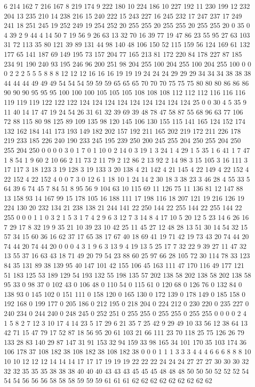 6 214 162 7 216 167 8 219 174 9 222 180 10 224 186 10 227 192 11 230 199 12 232 204 13 235 210 14 238 216 15 240 222 15 243 227 16 245 232 17 247 237 17 249 241 18 251 245 19 252 249 19 254 252 20 255 255 20 255 255 20 255 255 20 0 35 0 4 39 2 9 44 4 14 50 7 19 56 9 26 63 13 32 70 16 39 77 19 47 86 23 55 95 27 63 103 31 72 113 35 80 121 39 89 131 44 98 140 48 106 150 52 115 159 56 124 169 61 132 177 65 141 187 69 149 195 73 157 204 77 165 213 81 172 220 84 178 227 87 185 234 91 190 240 93 195 246 96 200 251 98 204 255 100 204 255 100 204 255 100 0 0 0 2 2 2 5 5 5 8 8 8 12 12 12 16 16 16 19 19 19 24 24 24 29 29 29 34 34 34 38 38 38 44 44 44 49 49 49 54 54 54 59 59 59 65 65 65 70 70 70 75 75 75 80 80 80 86 86 86 90 90 90 95 95 95 100 100 100 105 105 105 108 108 108 112 112 112 116 116 116 119 119 119 122 122 122 124 124 124 124 124 124 124 124 124 
25 0 0 30 4 5 35 9 11 40 14 17 47 19 24 54 26 31 61 32 39 69 39 48 78 47 58 87 55 68 96 63 77 106 72 88 115 80 98 125 89 109 135 98 120 145 106 130 155 115 141 165 124 152 174 132 162 184 141 173 193 149 182 202 157 192 211 165 202 219 172 211 226 178 219 233 185 226 240 190 233 245 195 239 250 200 245 255 204 250 255 204 250 255 204 250 0 0 0 0 3 0 1 7 0 1 10 0 2 14 0 3 19 1 3 24 1 4 29 1 5 35 1 6 41 1 7 47 1 8 54 1 9 60 2 10 66 2 11 73 2 11 79 2 12 86 2 13 92 2 14 98 3 15 105 3 16 111 3 17 117 3 18 123 3 19 128 3 19 133 3 20 138 4 21 142 4 21 145 4 22 149 4 22 152 4 22 152 4 22 152 4 0 0 7 3 0 12 6 1 18 10 1 24 14 2 30 18 3 38 23 3 46 28 4 55 33 5 64 39 6 74 45 7 84 51 8 95 56 9 104 63 10 115 69 11 126 75 11 136 81 12 147 88 13 158 93 14 167 99 15 178 105 16 188 111 
17 198 116 18 207 121 19 216 126 19 224 130 20 232 134 21 238 138 21 244 141 22 250 144 22 255 144 22 255 144 22 255 0 0 0 1 1 0 3 2 1 5 3 1 7 4 2 9 6 3 12 7 3 14 8 4 17 10 5 20 12 5 23 14 6 26 16 7 29 17 8 32 19 9 35 21 10 39 23 10 42 25 11 45 27 12 48 28 13 51 30 14 54 32 15 57 34 15 60 36 16 62 37 17 65 38 17 67 40 18 69 41 19 71 42 19 73 43 20 74 44 20 74 44 20 74 44 20 0 0 0 4 3 1 9 6 3 13 9 4 19 13 5 25 17 7 32 22 9 39 27 11 47 32 13 55 37 16 63 43 18 71 49 20 79 54 23 88 60 25 97 66 28 105 72 30 114 78 33 123 84 35 131 89 38 139 95 40 147 101 42 155 106 45 163 111 47 170 116 49 177 121 51 183 125 53 189 129 54 193 132 55 198 135 57 202 138 58 202 138 58 202 138 58 95 33 0 98 37 0 102 43 0 106 48 0 110 54 0 115 61 0 120 68 0 126 76 0 132 84 0 138 93 0 145 102 
0 151 111 0 158 120 0 165 130 0 172 139 0 178 149 0 185 158 0 192 168 0 199 177 0 205 186 0 212 195 0 218 204 0 224 212 0 230 220 0 235 227 0 240 234 0 244 240 0 248 245 0 252 251 0 255 255 0 255 255 0 255 255 0 0 0 0 2 4 1 5 8 2 7 12 3 10 17 4 14 23 5 17 29 6 21 35 7 25 42 9 29 49 10 33 56 12 38 64 13 42 71 15 47 79 17 52 87 18 56 95 20 61 103 21 66 111 23 70 118 25 75 126 26 79 133 28 83 140 29 87 147 31 91 153 32 94 159 33 98 165 34 101 170 35 103 174 36 106 178 37 108 182 38 108 182 38 108 182 38 0 0 0 1 1 1 3 3 3 4 4 4 6 6 6 8 8 8 10 10 10 12 12 12 14 14 14 17 17 17 19 19 19 22 22 22 24 24 24 27 27 27 30 30 30 32 32 32 35 35 35 38 38 38 40 40 40 43 43 43 45 45 45 48 48 48 50 50 50 52 52 52 54 54 54 56 56 56 58 58 58 59 59 59 61 61 61 62 62 62 62 62 62 62 62 62 
